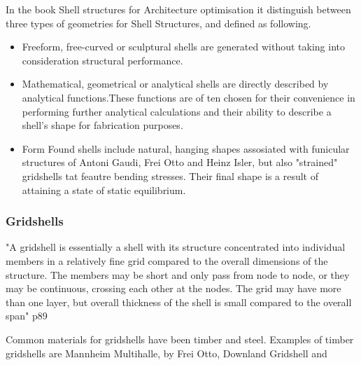 In the book Shell structures for Architecture optimisation it distinguish between three types of geometries for Shell Structures, and defined as following.

\begin{itemize}
\item Freeform, free-curved or sculptural shells are generated without taking into consideration structural performance.  
\item Mathematical, geometrical or analytical shells are directly described by analytical functions.These functions are of ten chosen for their convenience in performing further analytical calculations and their ability to describe a shell's shape for fabrication purposes.
\item Form Found shells include natural, hanging shapes assosiated with funicular structures of Antoni Gaudi, Frei Otto and Heinz Isler, but also "strained" gridshells tat feautre bending stresses. Their final shape is a result of attaining a state of static equilibrium.
\end{itemize}

\subsubsection{Gridshells}


"A gridshell is essentially a  shell with its structure concentrated into individual members in a relatively fine grid compared to the overall dimensions of the structure. The members may be short and only pass from node to node, or they may be continuous, crossing each other at the nodes. The grid may have more than one layer, but overall thickness of the shell is small compared to the overall span" p89

Common materials for gridshells have been timber and steel. Examples of timber gridshells are Mannheim Multihalle, by Frei Otto, Downland Gridshell and 

